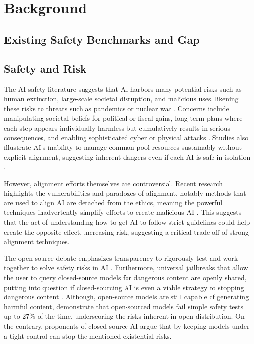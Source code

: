 \section{Background}

\subsection{Existing Safety Benchmarks and Gap}


\subsection{Safety and Risk}

The AI safety literature suggests that AI harbors many potential risks such as human extinction, large-scale societal disruption, and malicious uses, likening these risks to threats such as pandemics or nuclear war \citep{center_for_ai_safety_statement_2025, turchin_classification_2020}. Concerns include manipulating societal beliefs for political or fiscal gains, long-term plans where each step appears individually harmless but cumulatively results in serious consequences, and enabling sophisticated cyber or physical attacks \citep{shevlane_model_2023, ferrara_genai_2024}. Studies also illustrate AI's inability to manage common-pool resources sustainably without explicit alignment, suggesting inherent dangers even if each AI is safe in isolation \citep{perolat_multi_agent_2017, phelps_machine_2024}.

However, alignment efforts themselves are controversial. Recent research highlights the vulnerabilities and paradoxes of alignment, notably methods that are used to align AI are detached from the ethics, meaning the powerful techniques inadvertently simplify efforts to create malicious AI \citep{zhou_emulated_2024, west_ai_2024}. This suggests that the act of understanding how to get AI to follow strict guidelines could help create the opposite effect, increasing risk, suggesting a critical trade-off of strong alignment techniques.

The open-source debate emphasizes transparency to rigorously test and work together to solve safety risks in AI \citep{manchanda_open_2025}. Furthermore, universal jailbreaks that allow the user to query closed-source models for dangerous content are openly shared, putting into question if closed-sourcing AI is even a viable strategy to stopping dangerous content \citep{elderplinius2025l1b3rt4s, zou_universal_2023}. Although, open-source models are still capable of generating harmful content, \cite{vidgen_simplesafetytests_2024} demonstrate that open-sourced models fail simple safety tests up to 27\% of the time, underscoring the risks inherent in open distribution. On the contrary, proponents of closed-source AI argue that by keeping models under a tight control can stop the mentioned existential risks.

